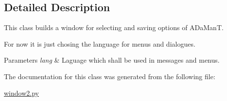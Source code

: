 \subsection{Detailed Description}
This class builds a window for selecting and saving options of A\-Da\-Man\-T. 

For now it is just chosing the language for menus and dialogues. 
\begin{DoxyParams}{Parameters}
{\em lang} & Laguage which shall be used in messages and menus. \\
\hline
\end{DoxyParams}


The documentation for this class was generated from the following file\-:\begin{DoxyCompactItemize}
\item 
\hyperlink{window2_8py}{window2.\-py}\end{DoxyCompactItemize}
